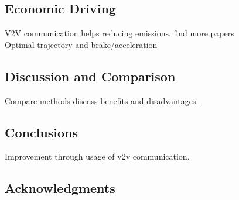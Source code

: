 \documentclass{sig-alternate}
\begin{document}
\subsection{Economic Driving}
V2V communication helps reducing emissions. find more papers \\
Optimal trajectory and brake/acceleration \cite{6856456} 
\subsection{Discussion and Comparison} Compare methods discuss benefits and disadvantages.
\subsection{Conclusions}
Improvement through usage of v2v communication. 

\subsection{Acknowledgments}


%

%
%
%


\end{document}
